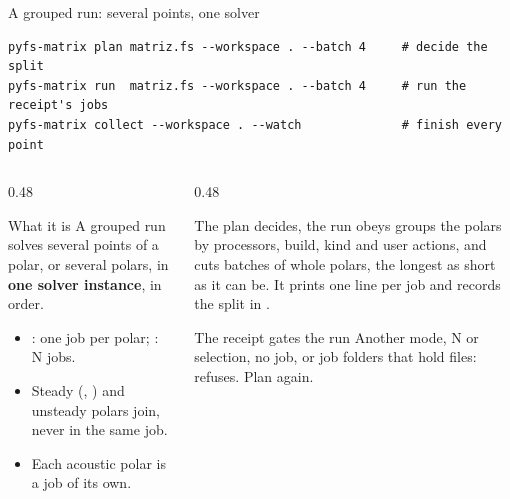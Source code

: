 \begin{frame}[fragile]{A grouped run: several points, one solver}
\begin{lstlisting}[style=ftsbase]
pyfs-matrix plan matriz.fs --workspace . --batch 4     # decide the split
pyfs-matrix run  matriz.fs --workspace . --batch 4     # run the receipt's jobs
pyfs-matrix collect --workspace . --watch              # finish every point
\end{lstlisting}
\begin{columns}[T]
\begin{column}{0.48\textwidth}
\begin{block}{What it is}
\small A grouped run solves several points of a polar, or several polars,
in \textbf{one solver instance}, in order.
\begin{itemize}\small
  \item {}: one job per polar; : N jobs.
  \item Steady (, ) and unsteady polars
        join, never in the same job.
  \item Each acoustic polar is a job of its own.
\end{itemize}
\end{block}
\end{column}
\begin{column}{0.48\textwidth}
\begin{block}{The plan decides, the run obeys}
\small {} groups the polars by processors, build, kind and user
actions, and cuts batches of whole polars, the longest as short as it can
be. It prints one line per job and records the split in .
\end{block}
\begin{alertblock}{The receipt gates the run}
\small Another mode, N or selection, no job, or job folders that hold
files:  refuses. Plan again.
\end{alertblock}
\end{column}
\end{columns}
\end{frame}

